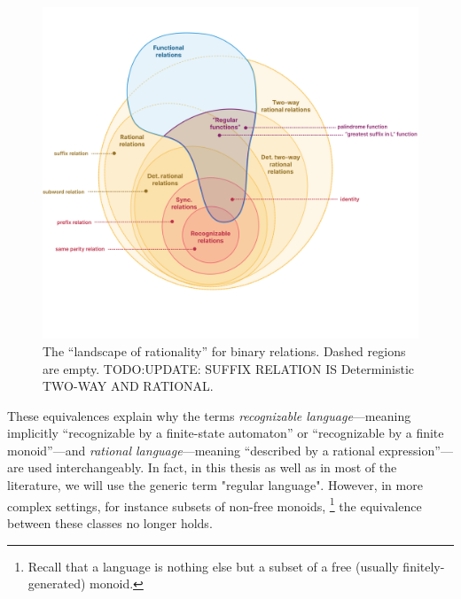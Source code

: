 \begin{figure}
	\centering
	\includegraphics[width=\linewidth]{fig/landscape-rationality-relations.png}
	\caption{
		\AP\label{fig:landscape-rationality-relations}
		The ``landscape of rationality'' for binary relations.
		Dashed regions are empty.
		TODO:UPDATE: SUFFIX RELATION IS Deterministic TWO-WAY AND RATIONAL.
	}
\end{figure}
These equivalences explain why the terms \emph{recognizable language}---meaning implicitly
``recognizable by a finite-state automaton'' or ``recognizable by a finite monoid''---and
\emph{rational language}---meaning ``described by a rational expression''---are used 
interchangeably. In fact, in this thesis as well as in most of the literature,
we will use the generic term "regular language".
However, in more complex settings, for instance subsets of non-free monoids,%
\footnote{Recall that a language is nothing else but a subset of a free
(usually finitely-generated) monoid.}
the equivalence between these classes no longer holds. \cite{Pin2021StackExchange}

